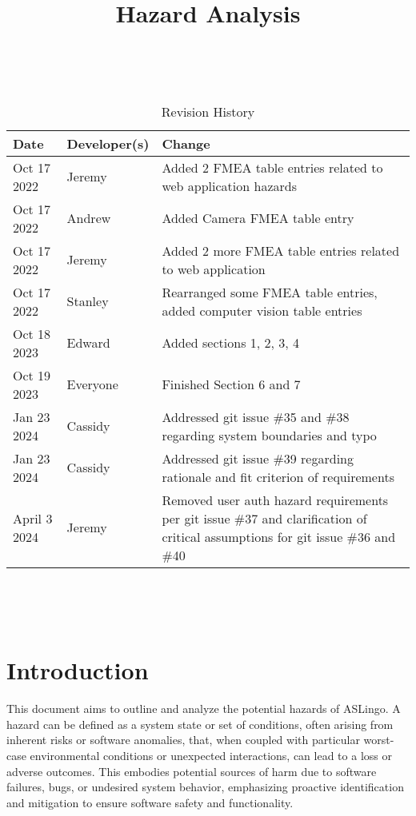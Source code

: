 \documentclass{article}
\title{Hazard Analysis\\\progname}
\author{\authname}
\date{}
\begin{document}
\maketitle
\thispagestyle{empty}

~\newpage


\begin{table}[hp]
\caption{Revision History} \label{TblRevisionHistory}
\begin{tabularx}{\textwidth}{llX}
\toprule
\textbf{Date} & \textbf{Developer(s)} & \textbf{Change}\\
\midrule
Oct 17 2022 & Jeremy & Added 2 FMEA table entries related to web application hazards\\
Oct 17 2022 & Andrew & Added Camera FMEA table entry\\
Oct 17 2022 & Jeremy & Added 2 more FMEA table entries related to web application\\
Oct 17 2022 & Stanley & Rearranged some FMEA table entries, added computer vision table entries\\
Oct 18 2023 & Edward & Added sections 1, 2, 3, 4\\
Oct 19 2023 & Everyone & Finished Section 6 and 7 \\
Jan 23 2024 & Cassidy & Addressed git issue \#35 and \#38 regarding system boundaries and typo \\
Jan 23 2024 & Cassidy & Addressed git issue \#39 regarding rationale and fit criterion of requirements \\
April 3 2024 & Jeremy & Removed user auth hazard requirements per git issue \#37 and clarification of critical assumptions for git issue \#36 and \#40\\
\bottomrule
\end{tabularx}
\end{table}

~\newpage

\tableofcontents

~\newpage


\section{Introduction}
This document aims to outline and analyze the potential hazards of ASLingo. A hazard can be defined as a system state or set of conditions, often arising from inherent risks or software anomalies, that, when coupled with particular worst-case environmental conditions or unexpected interactions, can lead to a loss or adverse outcomes. This embodies potential sources of harm due to software failures, bugs, or undesired system behavior, emphasizing proactive identification and mitigation to ensure software safety and functionality.
\end{document}
